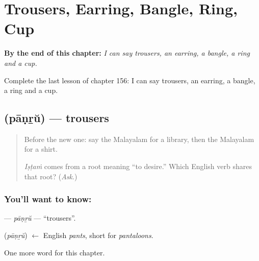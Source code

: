 
\chapter{Trousers, Earring, Bangle, Ring, Cup}
\label{ch:ml-trousers-earring-bangle-ring-cup}

\begin{chapteropening}
\textbf{By the end of this chapter:} \emph{I can say trousers, an earring, a bangle, a ring and a cup.}

Complete the last lesson of chapter 156: I can say trousers, an earring, a bangle, a ring and a cup.
\end{chapteropening}

\section[\texorpdfstring{\ml{പാന്റ്} (pāṇṟŭ)}{പാന്റ് (pāṇṟŭ)}]{ (pāṇṟŭ) — trousers}

\label{lesson:ML-C156-panru}



\begin{quote}
Before the new one: say the Malayalam for a library, then the Malayalam for a shirt.

\emph{Iṣṭaṁ} comes from a root meaning \textquotedblleft{}to desire.\textquotedblright{} Which English verb shares that root? (\emph{Ask}.)
\end{quote}

\subsection*{You'll want to know: }
\textbf{} — \emph{pāṇṟŭ} — \textquotedblleft{}trousers\textquotedblright{}.

\begin{cousinweb}
\textbf{} (\emph{pāṇṟŭ}) $\leftarrow$ English \emph{pants}, short for \emph{pantaloons}.
\end{cousinweb}

\begin{grammarlens}[title={What you've built}]
One more word for this chapter.
\end{grammarlens}

